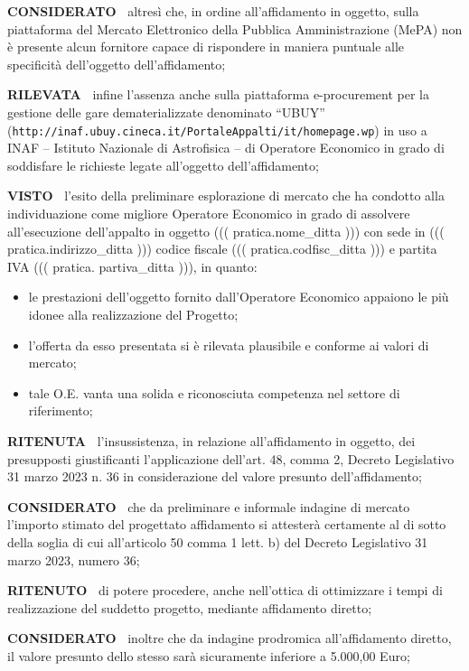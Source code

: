 \documentclass[a4paper,12pt]{letter}
\begin{document}
\textbf{CONSIDERATO~} altresì che, in ordine
all’affidamento in oggetto, sulla piattaforma del Mercato Elettronico
della Pubblica Amministrazione (MePA) non è presente alcun fornitore
capace di rispondere in maniera puntuale alle specificità dell’oggetto
dell’affidamento;

\textbf{RILEVATA~} infine l’assenza anche sulla piattaforma e-procurement per la
gestione delle gare dematerializzate denominato ``UBUY''
(\texttt{http://inaf.ubuy.cineca.it/PortaleAppalti/it/homepage.wp}) in uso a
INAF – Istituto Nazionale di Astrofisica – di Operatore Economico in
grado di soddisfare le richieste legate all’oggetto dell’affidamento;

\textbf{VISTO~} l’esito della preliminare
esplorazione di mercato che ha condotto alla individuazione come migliore
Operatore Economico in grado di assolvere all’esecuzione dell’appalto
in oggetto ((( pratica.nome_ditta ))) con sede in ((( pratica.indirizzo_ditta )))
codice fiscale ((( pratica.codfisc_ditta ))) e partita IVA ((( pratica. partiva_ditta ))),
in quanto:

\begin{itemize}
\item  le prestazioni dell’oggetto fornito dall’Operatore Economico
appaiono le più idonee alla realizzazione del Progetto;

\item 
l’offerta da esso presentata si è rilevata plausibile e conforme
ai valori di mercato;

\item tale O.E. vanta una solida e riconosciuta
competenza nel settore di riferimento;

\end{itemize}

\textbf{RITENUTA~}  l’insussistenza, in relazione
all’affidamento in oggetto, dei presupposti giustificanti
l’applicazione dell’art. 48, comma 2, Decreto Legislativo 31 marzo
2023 n. 36  in considerazione del valore presunto dell’affidamento; 

\textbf{CONSIDERATO~} che da preliminare e informale indagine
di mercato l’importo stimato del progettato affidamento si attesterà
certamente al di sotto della soglia di cui all’articolo 50 comma 1
lett. b) del Decreto Legislativo 31 marzo 2023, numero 36;

\textbf{RITENUTO~} di potere procedere, anche nell’ottica
di ottimizzare i tempi di realizzazione del suddetto progetto, mediante
affidamento diretto;

\textbf{CONSIDERATO~}  inoltre che da indagine prodromica
all’affidamento diretto, il valore presunto dello stesso sarà
sicuramente inferiore a 5.000,00 Euro;
\end{document}
